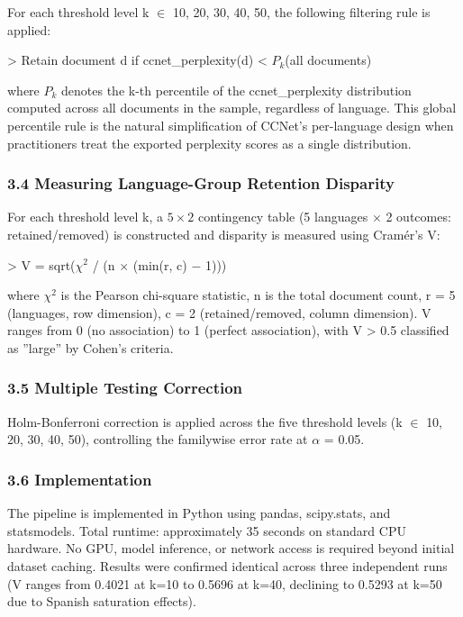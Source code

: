 For each threshold level k $\in$ {10, 20, 30, 40, 50}, the following filtering rule is applied:

> Retain document d if ccnet\_perplexity(d) < $P_k$(all documents)

where $P_k$ denotes the k-th percentile of the ccnet\_perplexity distribution computed across all documents in the sample, regardless of language. This global percentile rule is the natural simplification of CCNet's per-language design when practitioners treat the exported perplexity scores as a single distribution.

\subsubsection{3.4 Measuring Language-Group Retention Disparity}

For each threshold level k, a $5\times 2$ contingency table (5 languages $\times$ 2 outcomes: retained/removed) is constructed and disparity is measured using Cramér's V:

> V = sqrt($\chi^2$ / (n $\times$ (min(r, c) $-$ 1)))

where $\chi^2$ is the Pearson chi-square statistic, n is the total document count, r = 5 (languages, row dimension), c = 2 (retained/removed, column dimension). V ranges from 0 (no association) to 1 (perfect association), with V > 0.5 classified as ''large'' by Cohen's criteria.

\subsubsection{3.5 Multiple Testing Correction}

Holm-Bonferroni correction is applied across the five threshold levels (k $\in$ {10, 20, 30, 40, 50}), controlling the familywise error rate at $\alpha$ = 0.05.

\subsubsection{3.6 Implementation}

The pipeline is implemented in Python using pandas, scipy.stats, and statsmodels. Total runtime: approximately 35 seconds on standard CPU hardware. No GPU, model inference, or network access is required beyond initial dataset caching. Results were confirmed identical across three independent runs (V ranges from 0.4021 at k=10 to 0.5696 at k=40, declining to 0.5293 at k=50 due to Spanish saturation effects).

